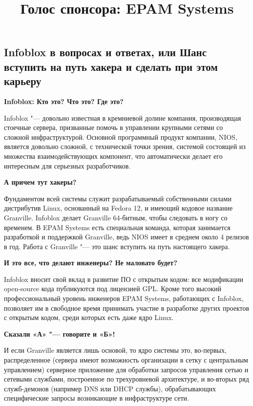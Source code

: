 \documentclass[10pt, a5paper]{article}
\begin{document}
\title{Голос спонсора: EPAM Systems}
\date{}
\maketitle

\subsection*{Infoblox в вопросах и ответах, или Шанс вступить на путь хакера и сделать при этом карьеру}

\textbf{Infoblox:  Кто это? Что это? Где это?}

Infoblox "--- довольно известная в кремниевой долине компания, производящая стоечные 
сервера, призванные помочь в управлении крупными сетями со сложной инфраструктурой. 
Основной программный продукт компании, NIOS, является довольно сложной, с технической 
точки зрения, системой состоящей из множества взаимодействующих компонент, что 
автоматически делает его интересным для серьезных разработчиков.

\textbf{А причем тут хакеры?}

Фундаментом всей системы служит разрабатываемый собственными силами дистрибутив 
Linux, основанный на Fedora 12, и имеющий кодовое название Granville.  Infoblox делает 
Granville 64-битным, чтобы следовать в ногу со временем. В EPAM Systems есть специальная 
команда, которая занимается разработкой и поддержкой Granville, ведь NIOS имеет в среднем 
около 4 релизов в год. Работа с Granville "--- это шанс вступить на путь настоящего хакера.

\textbf{И это все, что делают инженеры? Не маловато будет?}

Infoblox вносит свой вклад в развитие ПО с открытым кодом: все модификации open-source 
кода публикуются под лицензией GPL. Кроме того высокий профессиональный уровень 
инженеров EPAM Systems, работающих с Infoblox, позволяет им в свободное время принимать 
участие в разработке других проектов с открытым кодом, среди которых есть даже ядро 
Linux.

\textbf{Сказали «А» "--- говорите и «Б»!}

И если Granville является лишь основой, то ядро системы это, во-первых, распределенное 
(сервера имеют возможность организации в сетку с центральным управлением) серверное 
приложение для обработки запросов управления сетью и сетевыми службами, построенное 
по трехуровневой архитектуре, и во-вторых ряд служб-демонов (например DNS или DHCP 
службы), обрабатывающих специфические запросы возникающие в инфраструктуре сети.
\end{document}

